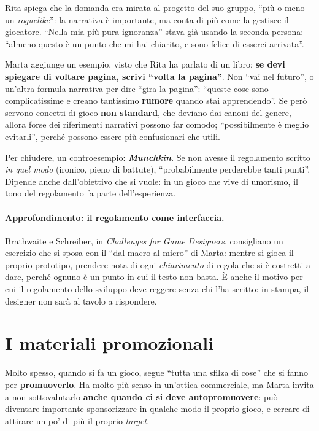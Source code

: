 Rita spiega che la domanda era mirata al progetto del suo gruppo, ``più o meno un
\emph{roguelike}'': la narrativa è importante, ma conta di più come la gestisce il
giocatore. ``Nella mia più pura ignoranza'' stava già usando la seconda persona: ``almeno
questo è un punto che mi hai chiarito, e sono felice di esserci arrivata''.

Marta aggiunge un esempio, visto che Rita ha parlato di un libro: \textbf{se devi spiegare
di voltare pagina, scrivi ``volta la pagina''}. Non ``vai nel futuro'', o un'altra
formula narrativa per dire ``gira la pagina'': ``queste cose sono complicatissime e creano
tantissimo \textbf{rumore} quando stai apprendendo''. Se però servono concetti di gioco
\textbf{non standard}, che deviano dai canoni del genere, allora forse dei riferimenti
narrativi possono far comodo; ``possibilmente è meglio evitarli'', perché possono essere
più confusionari che utili.

Per chiudere, un controesempio: \textbf{\emph{Munchkin}}. Se non avesse il regolamento
scritto \emph{in quel modo} (ironico, pieno di battute), ``probabilmente perderebbe tanti
punti''. Dipende anche dall'obiettivo che si vuole: in un gioco che vive di umorismo, il tono
del regolamento fa parte dell'esperienza.

\paragraph{Approfondimento: il regolamento come interfaccia.} Brathwaite e Schreiber, in
\emph{Challenges for Game Designers}, consigliano un esercizio che si sposa con il ``dal
macro al micro'' di Marta: mentre si gioca il proprio prototipo, prendere nota di ogni
\emph{chiarimento} di regola che si è costretti a dare, perché ognuno è un punto in cui il
testo non basta. È anche il motivo per cui il regolamento dello sviluppo deve reggere senza
chi l'ha scritto: in stampa, il designer non sarà al tavolo a rispondere.

\section{I materiali promozionali}
\label{a14:sec:promo}

Molto spesso, quando si fa un gioco, segue ``tutta una sfilza di cose'' che si fanno per
\textbf{promuoverlo}. Ha molto più senso in un'ottica commerciale, ma Marta invita a non
sottovalutarlo \textbf{anche quando ci si deve autopromuovere}: può diventare importante
sponsorizzare in qualche modo il proprio gioco, e cercare di attirare un po' di più il
proprio \emph{target}.

